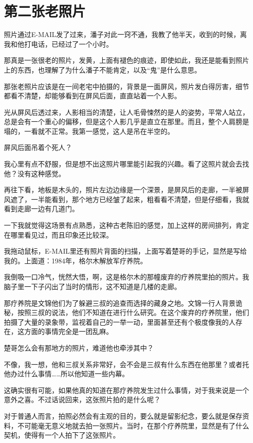 \chapter{第二张老照片}

照片通过E-MAIL发了过来，潘子对此一窍不通，我教了他半天，收到的时候，离我和他打电话，已经过了一个小时。

那真是一张很老的照片，发黄，上面有褪色的痕迹，即使如此，我还是能看到照片上的东西，也理解了为什么潘子不能肯定，以及“鬼”是什么意思。

那张老照片应该是在一间老宅中拍摄的，背景是一面屏风，照片发白得厉害，细节都看不清楚，却能够看到在屏风后面，直直站着一个人影。

光从屏风后透过来，人影相当的清楚，让人毛骨悚然的是人的姿势，平常人站立，总是会有一个重心的偏移，但是这个人影几乎是直立在那里。而且，整个人肩膀是塌的，一看就不正常。我第一感觉，这人是吊在半空的。

屏风后面吊着个死人？

我心里有点不舒服，但是想不出这照片哪里能引起我的兴趣。看了这照片就会去找他？没有这种感觉。

再往下看，地板是木头的，照片左边边缘是一个深景，是屏风后的走廊，一半被屏风遮了，一半能看到，那个地方已经皱了起来，粗看看不清楚，但是仔细看，我就看到走廊一边有几道门。

一下我就觉得这场景有点熟悉，这种古老陈旧的感觉，加上这样的房间排列，肯定在哪里看见过，而且印象还比较深。

我拖动鼠标，E-MAIL里还有照片背面的扫描，上面写着楚哥的手记，显然是写给我的。上面道：1984年，格尔木解放军疗养院。

我倒吸一口冷气，恍然大悟，啊，这是格尔木的那幢废弃的疗养院里拍的照片。我脑子里一下子闪出了当时的情形，这不知道是几楼的走廊。

那疗养院是文锦他们为了躲避三叔的追查而选择的藏身之地。文锦一行人背景诡秘，按照三叔的说法，他们不知道在进行什么研究。在这个废弃的疗养院里，他们拍摄了大量的录象带，监视着自己的一举一动，里面甚至还有个极度像我的人存在，这方面的事情完全是一团乱麻。

楚哥怎么会有那地方的照片，难道他也牵涉其中？

不像，我一想，他和三叔关系非常好，会不会是三叔有什么东西在他那里？或者托他办过什么事情……所以他知道一些内幕。

这确实很有可能，如果他真的知道在那疗养院发生过什么事情，对于我来说是一个意外之喜。不过话说回来，这张照片拍的是什么呢？

对于普通人而言，拍照必然会有主观的目的，要么就是留影纪念，要么就是保存资料，不可能毫无意义地就去拍一张照片。当时，在那个疗养院里，显然是有了什么契机，使得有一个人拍下了这张照片。

